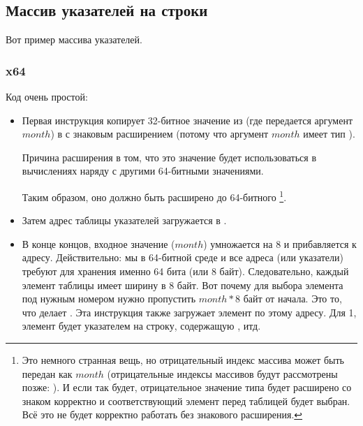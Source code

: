 ﻿\subsection{Массив указателей на строки}
\label{array_of_pointers_to_strings}

Вот пример массива указателей.



\subsubsection{x64}



Код очень простой:

\begin{itemize}

\item
{}
Первая инструкция  копирует 32-битное значение из \ECX (где передается аргумент $month$)
в \RAX с знаковым расширением (потому что аргумент $month$ имеет тип \Tint).

Причина расширения в том, что это значение будет использоваться в вычислениях наряду с другими 64-битными
значениями.

Таким образом, оно должно быть расширено до 64-битного
\footnote{Это немного странная вещь, но отрицательный индекс массива может быть передан как $month$ 
(отрицательные индексы массивов будут рассмотрены позже: ).
И если так будет, отрицательное значение типа \Tint будет расширено со знаком корректно
и соответствующий элемент перед таблицей будет выбран.
Всё это не будет корректно работать без знакового расширения.}.

\item
Затем адрес таблицы указателей загружается в \RCX.

\item
В конце концов, входное значение ($month$) умножается на 8 и прибавляется к адресу.
Действительно: мы в 64-битной среде и все адреса (или указатели) 
требуют для хранения именно 64 бита (или 8 байт).
Следовательно, каждый элемент таблицы имеет ширину в 8 байт.
Вот почему для выбора элемента под нужным номером нужно пропустить $month*8$ байт от начала.
Это то, что делает \MOV.
Эта инструкция также загружает элемент по этому адресу.
Для 1, элемент будет указателем на строку, содержащую , итд.

\end{itemize}

